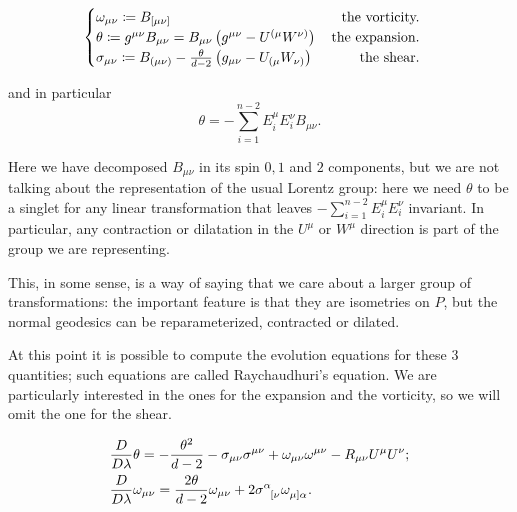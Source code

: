 	\begin{equation}
	\label{eq:def-expansion-vorticity-shear}
		\begin{cases}
		\omega_{\mu\nu} \coloneqq B_{[\mu\nu]} \hfill \text{the vorticity.} \\
		\theta \coloneqq g^{\mu\nu}B_{\mu\nu}  = B_{\mu\nu} \left(g^{\mu\nu} - U^{(\mu}W^{\nu)}\right) \hfill \quad \text{the expansion.} \\
		\sigma_{\mu\nu} \coloneqq B_{(\mu\nu)} - \frac{\theta}{d - 2}\left(g_{\mu\nu} - U_{(\mu}W_{\nu)}\right) \hfill \quad \text{ the shear.}
		\end{cases}
	\end{equation}
	
	and in particular
	\[
	\theta = - \sum_{i=1}^{n - 2}E_i^{\mu}E_i^{\nu} B_{\mu\nu}.
	\]
	\begin{remark}
		Here we have decomposed \(B_{\mu\nu}\) in its spin \(0, 1\) and \(2\) components, but we are not talking about the representation of the usual Lorentz group: here we need \(\theta\) to be a singlet for any linear transformation that leaves \(- \sum_{i=1}^{n - 2}E_i^{\mu}E_i^{\nu}\) invariant. In particular, any contraction or dilatation in the \(U^{\mu}\) or \(W^{\mu}\) direction is part of the group we are representing.
		
		This, in some sense, is a way of saying that we care about a larger group of transformations: the important feature is that they are isometries on \(P\), but the normal geodesics can be reparameterized, contracted or dilated.
	\end{remark}
	
	At this point it is possible to compute the evolution equations for these \(3\) quantities; such equations are called Raychaudhuri's equation.
	We are particularly interested in the ones for the expansion and the vorticity, so we will omit the one for the shear.
	
	\begin{align}
		\label{eq:Raychaudhuri-theta}
		&\frac{D}{D\lambda}\theta = -\frac{\theta^2}{d - 2} - \sigma_{\mu\nu}\sigma^{\mu\nu} + \omega_{\mu\nu}\omega^{\mu\nu}  - R_{\mu\nu}U^{\mu}U^{\nu}; \\
		\label{eq:Raychaudhuri-vorticity}
		&\frac{D}{D\lambda}\omega_{\mu\nu} = \frac{2\theta}{d - 2}\omega_{\mu\nu} + 2\sigma\indices{^{\alpha}_{[\nu}}\omega\indices{_{\mu]\alpha}}.
	\end{align}
	

